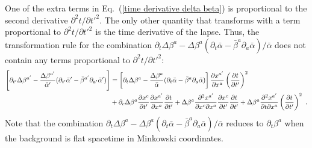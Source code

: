 \documentclass[letterpaper,nofootinbib,prd,amsmath,onecolumn]{revtex4-1}
\begin{document}
One of the extra terms in Eq.~(\ref{time derivative delta beta}) is proportional to the second derivative $\partial^2 t/\partial {t'}^2$. 
The only other quantity that 
transforms with a term proportional to $\partial^2 t/\partial {t'}^2$ is the time derivative of the lapse. Thus,  the transformation rule for 
the combination 
$\partial_t \Delta\beta^a - \Delta\beta^a(\partial_t\bar\alpha -\bar\beta^a \partial_a \bar\alpha)/\bar\alpha$
does not contain any terms proportional to $\partial^2 t/\partial {t'}^2$: 
\begin{align}\label{combinationtransfrule} 
\left[ \partial_{t'}\Delta \beta^{a'} - \frac{\Delta\beta^{a'}}{\bar\alpha'} (\partial_{t'}\bar\alpha' -\bar\beta^{a'} \partial_{a'} \bar\alpha') \right]
& = \left[ \partial_{t}\Delta \beta^{a} - \frac{\Delta\beta^{a}}{\bar\alpha} (\partial_{t}\bar\alpha -\bar\beta^{a} \partial_{a} \bar\alpha)
\right] \frac{\partial x^{a'}}{\partial x^{a}}\left(\frac{\partial t}{\partial t'}\right)^{2} \notag\\
& + \partial_{c}\Delta \beta^{a}\frac{\partial x^{c}}{\partial t'}\frac{\partial x^{a'}}{\partial x^{a}}\frac{\partial t}{\partial t'} 
+ \Delta \beta^{a}\frac{\partial^{2} x^{a'}}{\partial x^{c}\partial x^{a}}\frac{\partial x^{c}}{\partial t'}\frac{\partial t}{\partial t'} 
+ \Delta \beta^{a}\frac{\partial^{2}x^{a'}}{\partial t\partial x^{a}}\left(\frac{\partial t}{\partial t'}\right)^{2} \ .
\end{align}
Note that the combination $\partial_t \Delta\beta^a - \Delta\beta^a(\partial_t\bar\alpha -\bar\beta^a \partial_a \bar\alpha)/\bar\alpha$ 
reduces to $\partial_t \beta^a$ when the background is flat spacetime in Minkowski coordinates. 
\end{document}
